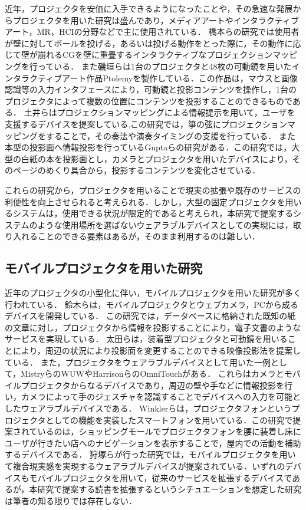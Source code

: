 近年，プロジェクタを安価に入手できるようになったことや，その急速な発展からプロジェクタを用いた研究は盛んであり，メディアアートやインタラクティブアート，MR，HCIの分野などで主に使用されている．
橋本らの研究では使用者が壁に対してボールを投げる，あるいは投げる動作をとった際に，その動作に応じて壁が崩れるCGを壁に重畳するインタラクティブなプロジェクションマッピングを行っている\cite{hashimoto}．
また磯垣らは1台のプロジェクタと48枚の可動鏡を用いたインタラクティブアート作品Ptolemyを製作している\cite{isogaki}．この作品は，マウスと画像認識等の入力インタフェースにより，可動鏡と投影コンテンツを操作し，1台のプロジェクタによって複数の位置にコンテンツを投影することのできるものである．
土井らはプロジェクションマッピングによる情報提示を用いて，ユーザを支援するデバイスを提案している\cite{doi}.この研究では，箏の弦にプロジェクションマッピングをすることで，その奏法や演奏タイミングの支援を行っている．
また本型の投影面へ情報投影を行っているGuptaらの研究がある\cite{gupta}．この研究では，大型の白紙の本を投影面とし，カメラとプロジェクタを用いたデバイスにより，そのページのめくり具合から，投影するコンテンツを変化させている．

これらの研究から，プロジェクタを用いることで現実の拡張や既存のサービスの利便性を向上させられると考えられる．しかし，大型の固定プロジェクタを用いるシステムは，使用できる状況が限定的であると考えられ，本研究で提案するシステムのような使用場所を選ばないウェアラブルデバイスとしての実現には，取り入れることのできる要素はあるが，そのまま利用するのは難しい．

\subsection{モバイルプロジェクタを用いた研究}

近年のプロジェクタの小型化に伴い，モバイルプロジェクタを用いた研究が多く行われている．
鈴木らは，モバイルプロジェクタとウェブカメラ，PCから成るデバイスを開発している\cite{suzuki}．
この研究では，データベースに格納された既知の紙の文章に対し，プロジェクタから情報を投影することにより，電子文書のようなサービスを実現している．
太田らは，装着型プロジェクタと可動鏡を用いることにより，周辺の状況により投影面を変更することのできる映像投影法を提案している\cite{ota}．
また，プロジェクタをウェアラブルデバイスとして用いた一例として，MistryらのWUWやHarrisonらのOmniTouchがある\cite{pranav,chris}．
これらはカメラとモバイルプロジェクタからなるデバイスであり，周辺の壁や手などに情報投影を行い，カメラによって手のジェスチャを認識することでデバイスへの入力を可能としたウェアラブルデバイスである．
Winklerらは，プロジェクタフォンというプロジェクタとしての機能を実装したスマートフォンを用いている\cite{christian}．この研究で提案されているのは，ショッピングモールでプロジェクタフォンを腰に装着し床にユーザが行きたい店へのナビゲーションを表示することで，屋内での活動を補助するデバイスである．
狩塚らが行った研究では，モバイルプロジェクタを用いて複合現実感を実現するウェアラブルデバイスが提案されている\cite{karitsuka}．いずれのデバイスもモバイルプロジェクタを用いて，従来のサービスを拡張するデバイスであるが，本研究で提案する読書を拡張するというシチュエーションを想定した研究は筆者の知る限りでは存在しない．

